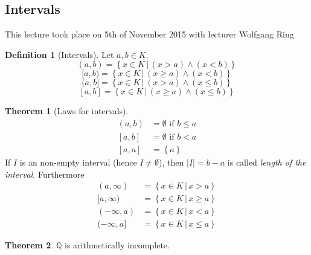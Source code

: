 \documentclass[a4paper,landscape,twocolumn]{article}
\theoremstyle{definition}
\newtheorem{theorem}{Theorem}
\newtheorem{defi}{Definition}
\newcommand\set[1]{\left\{#1\right\}}
\newcommand\setdef[2]{\left\{#1\,|\,#2\right\}}
\newcommand\abs[1]{\left|#1\right|}
\newcommand\meta[3]{\begin{mdframed}[skipbelow=4pt,skipabove=4pt,innermargin=1pt,innerleftmargin=1pt,innerrightmargin=1pt]\begin{center}\small{\textdownarrow{} This #1 took place on #2 with lecturer #3}\end{center}\end{mdframed}}
\begin{document}
\subsection{Intervals}
\meta{lecture}{5th of November 2015}{Wolfgang Ring}

\begin{defi}[Intervals]
  Let $a, b \in K$.
  \[ (a,b) = \setdef{x \in K}{(x > a) \land (x < b)} \]
  \[ [a, b) = \setdef{x \in K}{(x \geq a) \land (x < b)} \]
  \[ (a, b] = \setdef{x \in K}{(x > a) \land (x \leq b)} \]
  \[ [a, b] = \setdef{x \in K}{(x \geq a) \land (x \leq b)} \]
\end{defi}


\begin{theorem}[Laws for intervals]
  \begin{align}
    (a, b) &= \emptyset \text{ if } b \leq a \\
    [a, b] &= \emptyset \text{ if } b < a \\
    [a, a] &= \set{a}
  \end{align}
  If $I$ is an non-empty interval (hence $I \neq \emptyset$),
  then $\abs{I} = b - a$ is called \emph{length of the interval}.
  Furthermore
  \begin{align}
    (a, \infty) &= \setdef{x \in K}{x > a} \\
    [a, \infty) &= \setdef{x \in K}{x \geq a} \\
    (-\infty, a) &= \setdef{x \in K}{x < a} \\
    (-\infty, a] &= \setdef{x \in K}{x \leq a}
  \end{align}
\end{theorem}

\begin{theorem}
  $\mathbb Q$ is arithmetically incomplete.
\end{theorem}
\end{document}
